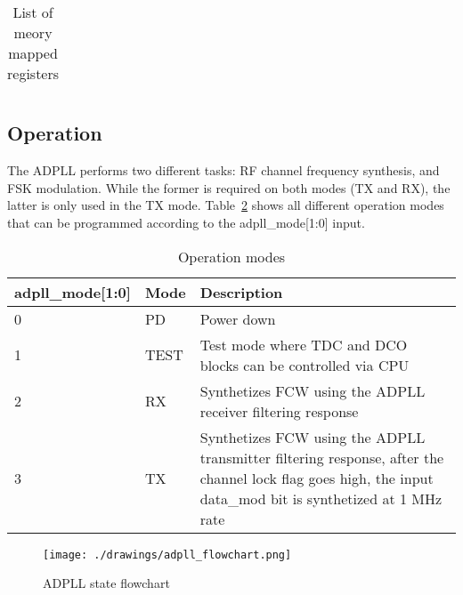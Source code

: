 \begin{table}[!h]
\begin{tabular}{|p{3.7cm}|p{1cm}|p{1.2cm}|p{0.8cm}|p{7cm}|p{1.2cm}|}
    
    \end{tabular}
  \caption{List of meory mapped registers}
  \label{tab:adpll_registers}
\end{table}


\subsection{Operation}

The ADPLL performs two different tasks: RF channel frequency synthesis, and FSK
modulation. While the former is required on both modes (TX and RX), the latter
is only used in the TX mode. Table~\ref{tab:adpll_modes} shows all different
operation modes that can be programmed according to the adpll\_mode[1:0] input.

\begin{table}[!h]
  \centering
    \begin{tabular}{|p{2.5cm}|p{1.5cm}|p{9cm}|}
      \hline
      \rowcolor{tab-green}
    {\bf adpll\_mode[1:0]} & {\bf Mode} & {\bf Description} \\
    \hline \hline 
    0    & PD   & Power down\\
    \hline
    1    & TEST & Test mode where TDC and DCO blocks can be controlled via CPU\\
    \hline
    2    & RX   & Synthetizes FCW using the ADPLL receiver filtering response \\
    \hline
    3    & TX   & Synthetizes FCW using the ADPLL transmitter filtering response, after the channel lock flag goes high, the input data\_mod bit is synthetized at 1 MHz rate\\
    \hline
    
    \end{tabular}
  \caption{Operation modes}
  \label{tab:adpll_modes}
\end{table}




\begin{figure}[!h]
  
  \centering
      {\texttt{[image: ./drawings/adpll\_flowchart.png]}}
  \caption{ADPLL state flowchart}
  \label{fig:adpll_flowchart}
\end{figure}

